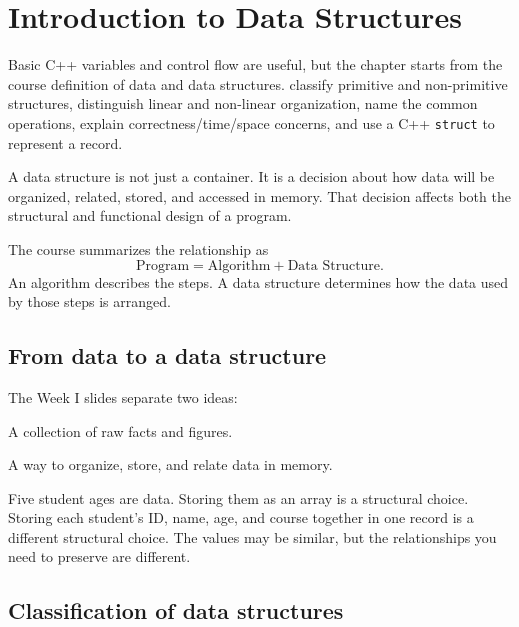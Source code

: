\chapter{Introduction to Data Structures}\label{ch:introduction}

\chapterguide%
  {Basic C++ variables and control flow are useful, but the chapter starts from the course definition of data and data structures.}
  {classify primitive and non-primitive structures, distinguish linear and non-linear organization, name the common operations, explain correctness/time/space concerns, and use a C++ \texttt{struct} to represent a record.}

A data structure is not just a container. It is a decision about how data will be organized, related, stored, and accessed in memory. That decision affects both the structural and functional design of a program.

\begin{keyidea}
The course summarizes the relationship as
\[
\text{Program} = \text{Algorithm} + \text{Data Structure}.
\]
An algorithm describes the steps. A data structure determines how the data used by those steps is arranged.
\end{keyidea}

\section{From data to a data structure}

The Week I slides separate two ideas:

\begin{description}[leftmargin=1.4in,style=nextline]
  \item[Data] A collection of raw facts and figures.
  \item[Data structure] A way to organize, store, and relate data in memory.
\end{description}

\begin{intuition}
Five student ages are data. Storing them as an array is a structural choice. Storing each student's ID, name, age, and course together in one record is a different structural choice. The values may be similar, but the relationships you need to preserve are different.
\end{intuition}

\section{Classification of data structures}

